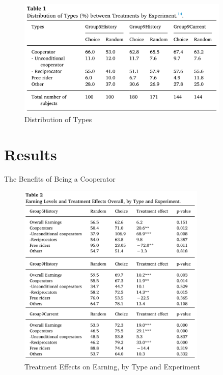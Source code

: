 \documentclass[
  10pt,
  ignorenonframetext,
  aspectratio=43,
]{beamer}
\begin{document}
\begin{frame}
\begin{figure}
\centering
\includegraphics[width=0.9\textwidth,height=\textheight]{20220426-serdarevic-nina-it-pays-to-be-nice.assets/image-20220425210127736.png}
\caption{Distribution of Types}
\end{figure}
\end{frame}

\hypertarget{results}{%
\section{Results}\label{results}}

\begin{frame}{The Benefits of Being a Cooperator}
\protect\hypertarget{the-benefits-of-being-a-cooperator}{}
\begin{figure}
\centering
\includegraphics[width=0.8\textwidth,height=\textheight]{20220426-serdarevic-nina-it-pays-to-be-nice.assets/Pasted image 20220424001212.png}
\caption{Treatment Effects on Earning, by Type and Experiment}
\end{figure}
\end{frame}
\end{document}
